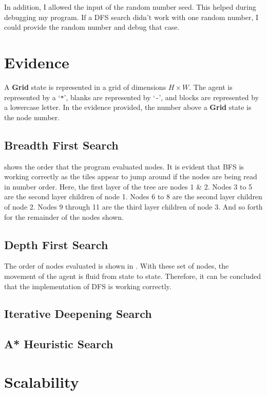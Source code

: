 \documentclass[a4paper]{article}
\def \grid {\textbf{Grid}}
\begin{document}
In addition, I allowed the input of the random number seed.
This helped during debugging my program.
If a DFS search didn't work with one random number, I could provide the random number and debug that case.

\section{Evidence}
A {\grid} state is represented in a grid of dimensions $H \times W$.
The agent is represented by a `\texttt{*}', blanks are represented by `\texttt{-}', and blocks are represented by a lowercase letter.
In the evidence provided, the number above a {\grid} state is the node number.

\subsection{Breadth First Search}
 shows the order that the program evaluated nodes.
It is evident that BFS is working correctly as the tiles appear to jump around if the nodes are being read in number order.
Here, the first layer of the tree are nodes 1 \& 2.
Nodes 3 to 5 are the second layer children of node 1.
Nodes 6 to 8 are the second layer children of node 2.
Nodes 9 through 11 are the third layer children of node 3.
And so forth for the remainder of the nodes shown.

\subsection{Depth First Search}
The order of nodes evaluated is shown in .
With these set of nodes, the movement of the agent is fluid from state to state.
Therefore, it can be concluded that the implementation of DFS is working correctly.

\subsection{Iterative Deepening Search}


\subsection{A* Heuristic Search}


\section{Scalability}
\end{document}
